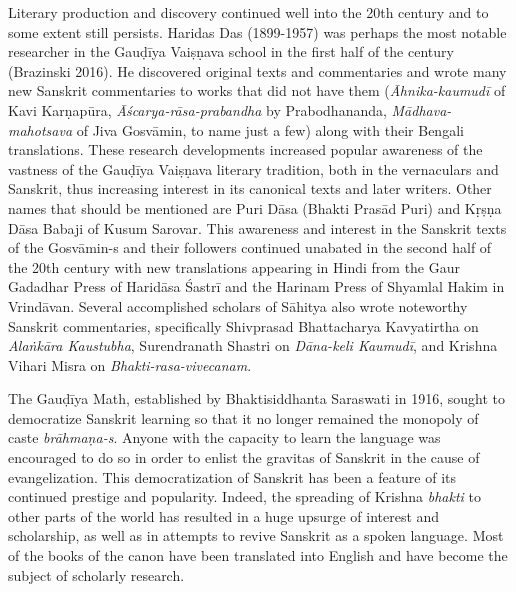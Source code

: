 Literary production and discovery continued well into the 20th century and to some extent still persists. Haridas Das (1899-1957) was perhaps the most notable researcher in the Gauḍīya Vaiṣṇava school in the first half of the century (Brazinski 2016). He discovered original texts and commentaries and wrote many new Sanskrit commentaries to works that did not have them ({\sl Āhnika-kaumudī} of Kavi Karṇapūra, {\sl Āścarya-rāsa-prabandha} by Prabodhananda, {\sl Mādhava-mahotsava} of Jiva Gosvāmin, to name just a few) along with their Bengali translations. These research developments increased popular awareness of the vastness of the Gauḍīya Vaiṣṇava literary tradition, both in the vernaculars and Sanskrit, thus increasing interest in its canonical texts and later writers. Other names that should be mentioned are Puri Dāsa (Bhakti Prasād Puri) and Kṛṣṇa Dāsa Babaji of Kusum Sarovar. This awareness and interest in the Sanskrit texts of the Gosvāmin-s and their followers continued unabated in the second half of the 20th century with new translations appearing in Hindi from the Gaur Gadadhar Press of Haridāsa Śastrī and the Harinam Press of Shyamlal Hakim in Vrindāvan. Several accomplished scholars of Sāhitya also wrote noteworthy Sanskrit commentaries, specifically Shivprasad Bhattacharya Kavyatirtha on {\sl Alaṅkāra Kaustubha}, Surendranath Shastri on {\sl Dāna-keli Kaumudī}, and Krishna Vihari Misra on {\sl Bhakti-rasa-vivecanam}. 

The Gauḍīya Math, established by Bhaktisiddhanta Saraswati in 1916, sought to democratize Sanskrit learning so that it no longer remained the monopoly of caste {\sl brāhmaṇa-s}. Anyone with the capacity to learn the language was encouraged to do so in order to enlist the gravitas of Sanskrit in the cause of evangelization. This democratization of Sanskrit has been a feature of its continued prestige and popularity. Indeed, the spreading of Krishna {\sl bhakti} to other parts of the world has resulted in a huge upsurge of interest and scholarship, as well as in attempts to revive Sanskrit as a spoken language. Most of the books of the canon have been translated into English and have become the subject of scholarly research. 

